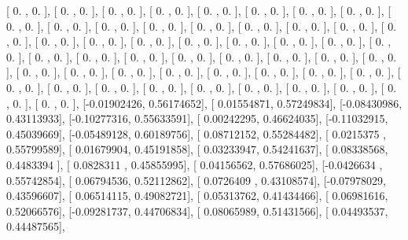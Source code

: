 \documentclass{article}
\begin{document}
       [ 0.        ,  0.        ],
       [ 0.        ,  0.        ],
       [ 0.        ,  0.        ],
       [ 0.        ,  0.        ],
       [ 0.        ,  0.        ],
       [ 0.        ,  0.        ],
       [ 0.        ,  0.        ],
       [ 0.        ,  0.        ],
       [ 0.        ,  0.        ],
       [ 0.        ,  0.        ],
       [ 0.        ,  0.        ],
       [ 0.        ,  0.        ],
       [ 0.        ,  0.        ],
       [ 0.        ,  0.        ],
       [ 0.        ,  0.        ],
       [ 0.        ,  0.        ],
       [ 0.        ,  0.        ],
       [ 0.        ,  0.        ],
       [ 0.        ,  0.        ],
       [ 0.        ,  0.        ],
       [ 0.        ,  0.        ],
       [ 0.        ,  0.        ],
       [ 0.        ,  0.        ],
       [ 0.        ,  0.        ],
       [ 0.        ,  0.        ],
       [ 0.        ,  0.        ],
       [ 0.        ,  0.        ],
       [ 0.        ,  0.        ],
       [ 0.        ,  0.        ],
       [ 0.        ,  0.        ],
       [ 0.        ,  0.        ],
       [ 0.        ,  0.        ],
       [ 0.        ,  0.        ],
       [ 0.        ,  0.        ],
       [ 0.        ,  0.        ],
       [ 0.        ,  0.        ],
       [ 0.        ,  0.        ],
       [ 0.        ,  0.        ],
       [ 0.        ,  0.        ],
       [ 0.        ,  0.        ],
       [ 0.        ,  0.        ],
       [ 0.        ,  0.        ],
       [ 0.        ,  0.        ],
       [ 0.        ,  0.        ],
       [ 0.        ,  0.        ],
       [ 0.        ,  0.        ],
       [ 0.        ,  0.        ],
       [ 0.        ,  0.        ],
       [ 0.        ,  0.        ],
       [ 0.        ,  0.        ],
       [ 0.        ,  0.        ],
       [-0.01902426,  0.56174652],
       [ 0.01554871,  0.57249834],
       [-0.08430986,  0.43113933],
       [-0.10277316,  0.55633591],
       [ 0.00242295,  0.46624035],
       [-0.11032915,  0.45039669],
       [-0.05489128,  0.60189756],
       [ 0.08712152,  0.55284482],
       [ 0.0215375 ,  0.55799589],
       [ 0.01679904,  0.45191858],
       [ 0.03233947,  0.54241637],
       [ 0.08338568,  0.4483394 ],
       [ 0.0828311 ,  0.45855995],
       [ 0.04156562,  0.57686025],
       [-0.0426634 ,  0.55742854],
       [ 0.06794536,  0.52112862],
       [ 0.0726409 ,  0.43108574],
       [-0.07978029,  0.43596607],
       [ 0.06514115,  0.49082721],
       [ 0.05313762,  0.41434466],
       [ 0.06981616,  0.52066576],
       [-0.09281737,  0.44706834],
       [ 0.08065989,  0.51431566],
       [ 0.04493537,  0.44487565],
\end{document}
